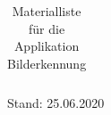 \begin{table}
\begin{longtable}{cp{6.1cm}p{2.5cm}c}
\end{longtable}

Stand: 25.06.2020

  \caption{Materialliste für die Applikation Bilderkennung}\label{Anhang:Materialliste}
\end{table}


